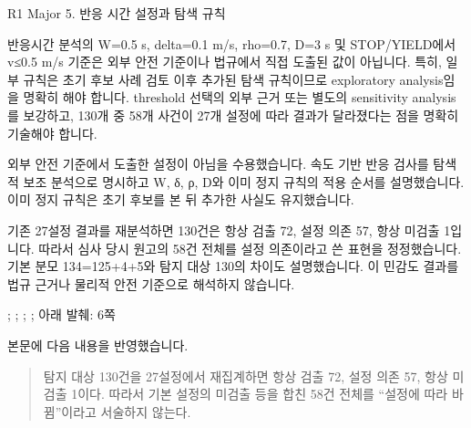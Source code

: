 \clearpage

\begin{reviewitem}{R1 Major 5. 반응 시간 설정과 탐색 규칙}

\begin{reviewercomment}

반응시간 분석의 W=0.5 s, delta=0.1 m/s, rho=0.7, D=3 s 및 STOP/YIELD에서 v≤0.5 m/s 기준은 외부 안전 기준이나 법규에서 직접 도출된 값이 아닙니다. 특히, 일부 규칙은 초기 후보 사례 검토 이후 추가된 탐색 규칙이므로 exploratory analysis임을 명확히 해야 합니다. threshold 선택의 외부 근거 또는 별도의 sensitivity analysis를 보강하고, 130개 중 58개 사건이 27개 설정에 따라 결과가 달라졌다는 점을 명확히 기술해야 합니다.

\end{reviewercomment}

\begin{authorresponse}

외부 안전 기준에서 도출한 설정이 아님을 수용했습니다. 속도 기반 반응 검사를 탐색적 보조 분석으로 명시하고 W, δ, ρ, D와 이미 정지 규칙의 적용 순서를 설명했습니다. 이미 정지 규칙은 초기 후보를 본 뒤 추가한 사실도 유지했습니다.

기존 27설정 결과를 재분석하면 130건은 항상 검출 72, 설정 의존 57, 항상 미검출 1입니다. 따라서 심사 당시 원고의 58건 전체를 설정 의존이라고 쓴 표현을 정정했습니다. 기본 분모 134=125+4+5와 탐지 대상 130의 차이도 설명했습니다. 이 민감도 결과를 법규 근거나 물리적 안전 기준으로 해석하지 않습니다.

\end{authorresponse}

\begin{manuscriptrevision}{; ; ; ; 아래 발췌: 6쪽}

본문에 다음 내용을 반영했습니다.

\begin{quote}

탐지 대상 130건을 27설정에서 재집계하면 항상 검출 72, 설정 의존 57, 항상 미검출 1이다. 따라서 기본 설정의 미검출 등을 합친 58건 전체를 ``설정에 따라 바뀜''이라고 서술하지 않는다.

\end{quote}

\end{manuscriptrevision}

\end{reviewitem}

\clearpage

